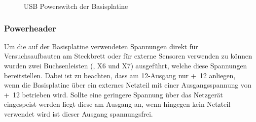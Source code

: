 \begin{figure}[htb]
    \centering
    \qquad
    \qquad
    \caption[USB Powerswitch der Basisplatine]{USB Powerswitch der \gls{Basisplatine}}
    \label{fig:basisplatine-power}
\end{figure}

\subsubsection{Powerheader}
Um die auf der \gls{Basisplatine} verwendeten Spannungen direkt für Versuchsaufbauten am Steckbrett oder für externe Sensoren verwenden zu können wurden zwei Buchsenleisten (, X6 und X7) ausgeführt, welche diese Spannungen bereitstellen. Dabei ist zu beachten, dass am \unit{12}{\volt}-Ausgang nur \unit{+12}{\volt} anliegen, wenn die Basisplatine über ein externes Netzteil mit einer Ausgangsspannung von \unit{+12}{\volt} betrieben wird. Sollte eine geringere Spannung über das Netzgerät eingespeist werden liegt diese am Ausgang an, wenn hingegen kein Netzteil verwendet wird ist dieser Ausgang spannungsfrei.

